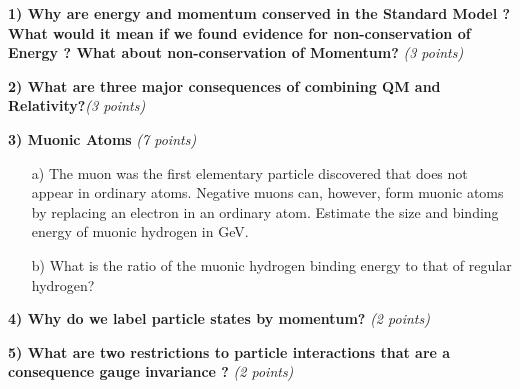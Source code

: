 {\large


\textbf{1) Why are energy and momentum conserved in the Standard Model ?  What would it mean if we found evidence for non-conservation of Energy ? What about non-conservation of Momentum? }\hfill \textit{(3 points)}\\

\vspace{3in}

\textbf{2) What are three major consequences of combining QM and Relativity?}\hfill \textit{(3 points)}\\

\vspace{3in}

\clearpage
\textbf{3) Muonic Atoms } \hfill \textit{(7 points)}\\
\begin{itemize}
\item[a)] The muon was the first elementary particle discovered that does not appear in ordinary atoms.  Negative muons can, however, form muonic atoms by replacing an electron in an ordinary atom. 
Estimate the size and binding energy of muonic hydrogen in GeV.
\vspace*{3in}
\item[b)] What is the ratio of the muonic hydrogen binding energy to that of regular hydrogen?
\vspace*{3in}
\end{itemize}



\textbf{4) Why do we label particle states by momentum? } \hfill \textit{(2 points)}\\

\vspace{2in}


\clearpage

\textbf{5) What are two restrictions to particle interactions that are a consequence gauge invariance ? }\hfill \textit{(2 points)}\\


}
